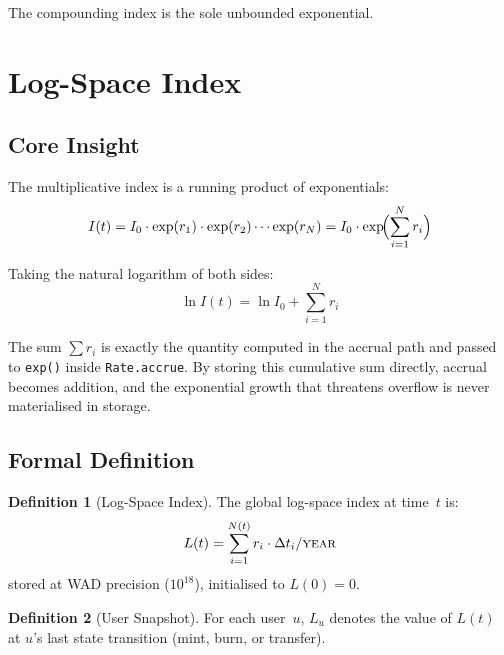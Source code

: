 \documentclass[10pt,a4paper,twocolumn]{article}
\theoremstyle{definition}
\newtheorem{definition}{Definition}[section]
\theoremstyle{plain}
\theoremstyle{remark}
\begin{document}
The compounding index is the sole unbounded exponential.

\section{Log-Space Index}
\label{sec:logindex}

\subsection{Core Insight}
\label{subsec:insight}

The multiplicative index is a running product of exponentials:
\begin{equation}
\label{eq:product}
I(t) = I_0 \cdot \exp(r_1) \cdot \exp(r_2) \cdots \exp(r_N) = I_0 \cdot \exp\!\Bigl(\sum_{i=1}^N r_i\Bigr)
\end{equation}

Taking the natural logarithm of both sides:
\begin{equation}
\label{eq:log-product}
\ln I(t) = \ln I_0 + \sum_{i=1}^N r_i
\end{equation}

The sum $\sum r_i$ is exactly the quantity computed in the accrual path and passed to \texttt{exp()} inside \texttt{Rate.accrue}. By storing this cumulative sum directly, accrual becomes addition, and the exponential growth that threatens overflow is never materialised in storage.

\subsection{Formal Definition}
\label{subsec:formal}

\begin{definition}[Log-Space Index]
\label{def:log-index}
The global log-space index at time~$t$ is:
\begin{equation}
\label{eq:log-index}
L(t) = \sum_{i=1}^{N(t)} r_i \cdot \Delta t_i / \textsc{year}
\end{equation}
stored at WAD precision ($10^{18}$), initialised to $L(0) = 0$.
\end{definition}

\begin{definition}[User Snapshot]
\label{def:user-snapshot}
For each user~$u$, $L_u$ denotes the value of $L(t)$ at $u$'s last state transition (mint, burn, or transfer).
\end{definition}
\end{document}
